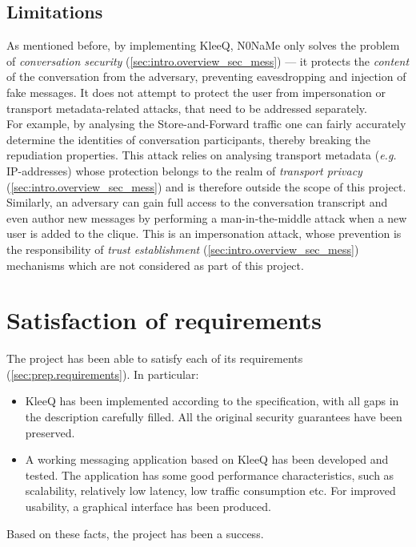 \documentclass[a4paper, twoside, 12pt]{report}
\newcommand{\funkytt}{\fontfamily{AnonymousPro}\selectfont}
\begin{document}
\subsection{Limitations}
\label{subsec:eval.sec.limit}

As mentioned before, by implementing KleeQ, {\funkytt N0NaMe} only solves the problem of \emph{conversation security} (\cref{sec:intro.overview_sec_mess}) --- it protects the \emph{content} of the conversation from the adversary, preventing eavesdropping and injection of fake messages. It does not attempt to protect the user from impersonation or transport metadata-related attacks, that need to be addressed separately. \\

For example, by analysing the Store-and-Forward traffic one can fairly accurately determine the identities of conversation participants, thereby breaking the repudiation properties. This attack relies on analysing transport metadata (\textit{e.g.} IP-addresses) whose protection belongs to the realm of \emph{transport privacy} (\cref{sec:intro.overview_sec_mess}) and is therefore outside the scope of this project. \\

Similarly, an adversary can gain full access to the conversation transcript and even author new messages by performing a man-in-the-middle attack when a new user is added to the clique. This is an impersonation attack, whose prevention is the responsibility of \emph{trust establishment} (\cref{sec:intro.overview_sec_mess}) mechanisms which are not considered as part of this project. 

\section{Satisfaction of requirements}
\label{sec:eval.req}
The project has been able to satisfy each of its requirements (\cref{sec:prep.requirements}). In particular:
\begin{itemize}
    \item KleeQ has been implemented according to the specification, with all gaps in the description carefully filled. All the original security guarantees have been preserved.
    \item A working messaging application based on KleeQ has been developed and tested. The application has some good performance characteristics, such as scalability, relatively low latency, low traffic consumption etc. For improved usability, a graphical interface has been produced.
\end{itemize}
Based on these facts, the project has been a success.
\end{document}
